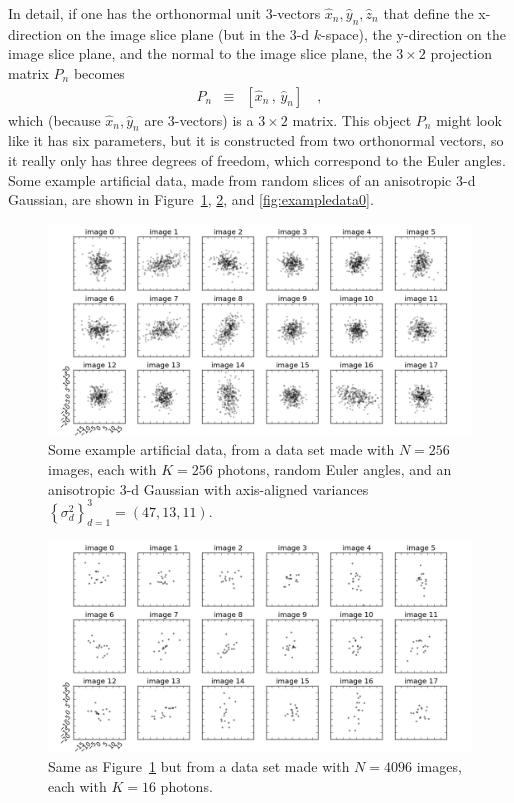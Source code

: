 \documentclass[12pt]{article}
\newcommand{\hoggcaption}[1]{\caption{\textsf{#1}}}
\renewcommand{\figurename}{\textsf{Figure}}
\newcommand{\unitvec}[1]{\hat{#1}}
\newcommand{\xhat}{\unitvec{x}}
\newcommand{\yhat}{\unitvec{y}}
\newcommand{\zhat}{\unitvec{z}}
\newcommand{\setof}[1]{\left\{{#1}\right\}}
\begin{document}
In detail, if one has the orthonormal unit 3-vectors
$\xhat_n,\yhat_n,\zhat_n$ that define the x-direction on the image
slice plane (but in the 3-d $k$-space), the y-direction on the image
slice plane, and the normal to the image slice plane, the $3\times 2$
projection matrix $P_n$ becomes
\begin{eqnarray}
  P_n &\equiv& [\xhat_n\,,\,\yhat_n]
  \quad ,
\end{eqnarray}
which (because $\xhat_n,\yhat_n$ are 3-vectors) is a $3\times2$ matrix.
This object $P_n$ might look like it has six parameters, but it is
constructed from two orthonormal vectors, so it really only has three
degrees of freedom, which correspond to the Euler angles.
Some example artificial data, made from random slices of an
anisotropic 3-d Gaussian, are shown in
\figurename~\ref{fig:exampledata8}, \ref{fig:exampledata4}, and \ref{fig:exampledata0}.
\begin{figure}[!tbp]
\includegraphics[width=\textwidth]{data_08_08.png}
\hoggcaption{Some example artificial data, from a data set made with
  $N=256$ images, each with $K=256$ photons, random Euler angles, and
  an anisotropic 3-d Gaussian with axis-aligned variances
  $\setof{\sigma^2_d}_{d=1}^3 = (47, 13, 11)$.\label{fig:exampledata8}}
\end{figure}
\begin{figure}[!tbp]
\includegraphics[width=\textwidth]{data_12_04.png}
\hoggcaption{Same as \figurename~\ref{fig:exampledata8} but from a data set made with
  $N=4096$ images, each with $K=16$ photons.\label{fig:exampledata4}}
\end{figure}
\end{document}
